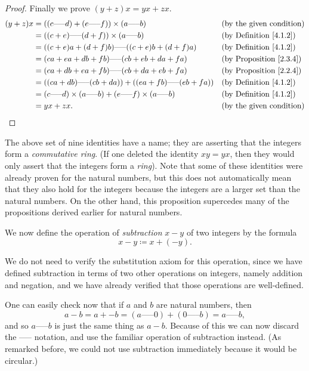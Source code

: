 \begin{proof}
Finally we prove \((y + z)x = yx + zx\).
\begin{align*}
(y + z)x &= ((c \text{-----} d) + (e \text{-----} f)) \times (a \text{-----} b) && \text{(by the given condition)} \\
&= ((c + e) \text{-----} (d + f)) \times (a \text{-----} b) && \text{(by Definition \ref{4.1.2})} \\
&= ((c + e)a + (d + f)b) \text{-----} ((c + e)b + (d + f)a) && \text{(by Definition \ref{4.1.2})} \\
&= (ca + ea + db + fb) \text{-----} (cb + eb + da + fa) && \text{(by Proposition \ref{2.3.4})} \\
&= (ca + db + ea + fb) \text{-----} (cb + da + eb + fa) && \text{(by Proposition \ref{2.2.4})} \\
&= ((ca + db) \text{-----} (cb + da)) + ((ea + fb) \text{-----} (eb + fa)) && \text{(by Definition \ref{4.1.2})} \\
&= (c \text{-----} d) \times (a \text{-----} b) + (e \text{-----} f) \times (a \text{-----} b) && \text{(by Definition \ref{4.1.2})} \\
&= yx + zx. && \text{(by the given condition)}
\end{align*}
\end{proof}

\begin{remark}\label{4.1.7}
The above set of nine identities have a name; they are asserting that the integers form a \emph{commutative ring}.
(If one deleted the identity \(xy = yx\), then they would only assert that the integers form a \emph{ring}).
Note that some of these identities were already proven for the natural numbers, but this does not automatically mean that they also hold for the integers because the integers are a larger set than the natural numbers.
On the other hand, this proposition supercedes many of the propositions derived earlier for natural numbers.
\end{remark}

We now define the operation of \emph{subtraction} \(x - y\) of two integers by the formula
\[
    x - y \coloneqq x + (-y).
\]

We do not need to verify the substitution axiom for this operation, since we have defined subtraction in terms of two other operations on integers, namely addition and negation, and we have already verified that those operations are well-defined.

One can easily check now that if \(a\) and \(b\) are natural numbers, then
\[
    a - b = a + -b = (a \text{-----} 0) + (0 \text{-----} b) = a \text{-----} b,
\]
and so \(a \text{-----} b\) is just the same thing as \(a - b\).
Because of this we can now discard the ----- notation, and use the familiar operation of subtraction instead.
(As remarked before, we could not use subtraction immediately because it would be circular.)

